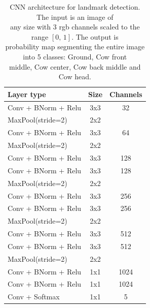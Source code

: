 \documentclass{cta-author}
\begin{document}
\begin{table}
\begin{center}
\begin{tabular}{|l|c|c|}
\hline
\textbf{Layer type} & \textbf{Size} & \textbf{Channels} \\
\hline

Conv + BNorm + Relu & 3x3 & 32 \\
MaxPool(stride=2) & 2x2 &  \\
\hline

Conv + BNorm + Relu & 3x3 & 64 \\
MaxPool(stride=2) & 2x2 &  \\
\hline

Conv + BNorm + Relu & 3x3 & 128 \\
Conv + BNorm + Relu & 3x3 & 128 \\
MaxPool(stride=2) & 2x2 &  \\
\hline

Conv + BNorm + Relu & 3x3 & 256 \\
Conv + BNorm + Relu & 3x3 & 256 \\
MaxPool(stride=2) & 2x2 &  \\
\hline

Conv + BNorm + Relu & 3x3 & 512 \\
Conv + BNorm + Relu & 3x3 & 512 \\
MaxPool(stride=2) & 2x2 &  \\
\hline

Conv + BNorm + Relu & 1x1 & 1024 \\
Conv + BNorm + Relu & 1x1 & 1024 \\
Conv + Softmax & 1x1 & 5 \\
\hline

\end{tabular}
\end{center}
\caption{CNN architecture for landmark detection.
The input is an image of \\
any size with 3 rgb channels scaled to the range $\left[0,\,1\right]$. The output is \\
probability map segmenting the entire image into 5 classes: Ground, Cow front \\
middle, Cow center, Cow back middle and Cow head.
}
\label{tab:cownet}
\end{table}
\end{document}
